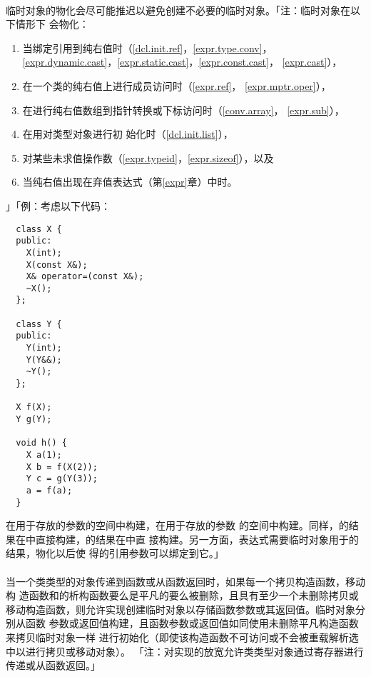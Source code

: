 \paragraph{}
临时对象的物化会尽可能推迟以避免创建不必要的临时对象。「注：临时对象在以下情形下
会物化：
\begin{enumerate}
  \item{当绑定引用到纯右值时（\ref{dcl.init.ref}，\ref{expr.type.conv}，
    \ref{expr.dynamic.cast}，\ref{expr.static.cast}，\ref{expr.const.cast}，
    \ref{expr.cast}），}
  \item{在一个类的纯右值上进行成员访问时（\ref{expr.ref}，
    \ref{expr.mptr.oper}），}
  \item{在进行纯右值数组到指针转换或下标访问时（\ref{conv.array}，
    \ref{expr.sub}），}
  \item{在用对类型对象进行初
    始化时（\ref{dcl.init.list}），}
  \item{对某些未求值操作数（\ref{expr.typeid}，\ref{expr.sizeof}），以及}
  \item{当纯右值出现在弃值表达式（第\ref{expr}章）中时。}
\end{enumerate}
」「例：考虑以下代码：
\begin{lstlisting}
  class X {
  public:
    X(int);
    X(const X&);
    X& operator=(const X&);
    ~X();
  };

  class Y {
  public:
    Y(int);
    Y(Y&&);
    ~Y();
  };

  X f(X);
  Y g(Y);

  void h() {
    X a(1);
    X b = f(X(2));
    Y c = g(Y(3));
    a = f(a);
  }
\end{lstlisting}
在用于存放的参数的空间中构建，在用于存放的参数
的空间中构建。同样，的结果在中直接构建，的结果在中直
接构建。另一方面，表达式需要临时对象用于的结果，物化以后使
得的引用参数可以绑定到它。」

\paragraph{}
当一个类类型的对象传递到函数或从函数返回时，如果每一个拷贝构造函数，移动构
造函数和的析构函数要么是平凡的要么被删除，且具有至少一个未删除拷贝或
移动构造函数，则允许实现创建临时对象以存储函数参数或其返回值。临时对象分别从函数
参数或返回值构建，且函数参数或返回值如同使用未删除平凡构造函数来拷贝临时对象一样
进行初始化（即使该构造函数不可访问或不会被重载解析选中以进行拷贝或移动对象）。
「注：对实现的放宽允许类类型对象通过寄存器进行传递或从函数返回。」

